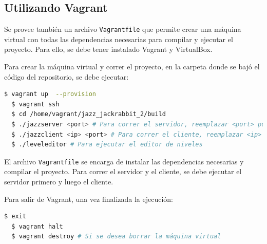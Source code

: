 \documentclass[titlepage,a4paper]{article}
\begin{document}
\subsection{Utilizando Vagrant}
Se provee también un archivo \texttt{Vagrantfile} que permite crear una máquina virtual con todas las dependencias necesarias para compilar y ejecutar el proyecto. Para ello, se debe tener instalado Vagrant y VirtualBox.

Para crear la máquina virtual y correr el proyecto, en la carpeta donde se bajó el código del repositorio, se debe ejecutar:

\begin{lstlisting}[language=sh,caption=Creación de la Máquina Virtual, captionpos=b]
  $ vagrant up  --provision
  $ vagrant ssh
  $ cd /home/vagrant/jazz_jackrabbit_2/build
  $ ./jazzserver <port> # Para correr el servidor, reemplazar <port> por un puerto a elección
  $ ./jazzclient <ip> <port> # Para correr el cliente, reemplazar <ip> por la IP del servidor (localhost) y <port> por el puerto
  $ ./leveleditor # Para ejecutar el editor de niveles
\end{lstlisting}

El archivo \texttt{Vagrantfile} se encarga de instalar las dependencias necesarias y compilar el proyecto. Para correr el servidor y el cliente, se debe ejecutar el servidor primero y luego el cliente.

Para salir de Vagrant, una vez finalizada la ejecución:

\begin{lstlisting}[language=sh,caption=Salir de Vagrant, captionpos=b]
  $ exit
  $ vagrant halt
  $ vagrant destroy # Si se desea borrar la máquina virtual
\end{lstlisting}
\end{document}
